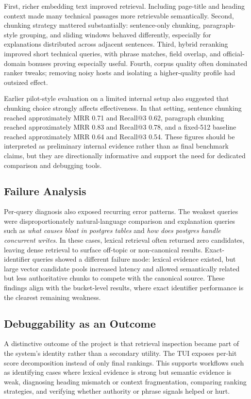 \documentclass[conference]{IEEEtran}
\begin{document}
First, richer embedding text improved retrieval. Including page-title and heading context made many technical passages more retrievable semantically. Second, chunking strategy mattered substantially: sentence-only chunking, paragraph-style grouping, and sliding windows behaved differently, especially for explanations distributed across adjacent sentences. Third, hybrid reranking improved short technical queries, with phrase matches, field overlap, and official-domain bonuses proving especially useful. Fourth, corpus quality often dominated ranker tweaks; removing noisy hosts and isolating a higher-quality profile had outsized effect.

Earlier pilot-style evaluation on a limited internal setup also suggested that chunking choice strongly affects effectiveness. In that setting, sentence chunking reached approximately MRR 0.71 and Recall@3 0.62, paragraph chunking reached approximately MRR 0.83 and Recall@3 0.78, and a fixed-512 baseline reached approximately MRR 0.64 and Recall@3 0.54. These figures should be interpreted as preliminary internal evidence rather than as final benchmark claims, but they are directionally informative and support the need for dedicated comparison and debugging tools.

\subsection{Failure Analysis}
Per-query diagnosis also exposed recurring error patterns. The weakest queries were disproportionately natural-language comparison and explanation queries such as \emph{what causes bloat in postgres tables} and \emph{how does postgres handle concurrent writes}. In these cases, lexical retrieval often returned zero candidates, leaving dense retrieval to surface off-topic or non-canonical results. Exact-identifier queries showed a different failure mode: lexical evidence existed, but large vector candidate pools increased latency and allowed semantically related but less authoritative chunks to compete with the canonical source. These findings align with the bucket-level results, where exact identifier performance is the clearest remaining weakness.

\subsection{Debuggability as an Outcome}
A distinctive outcome of the project is that retrieval inspection became part of the system's identity rather than a secondary utility. The TUI exposes per-hit score decomposition instead of only final rankings. This supports workflows such as identifying cases where lexical evidence is strong but semantic evidence is weak, diagnosing heading mismatch or context fragmentation, comparing ranking strategies, and verifying whether authority or phrase signals helped or hurt.
\end{document}
